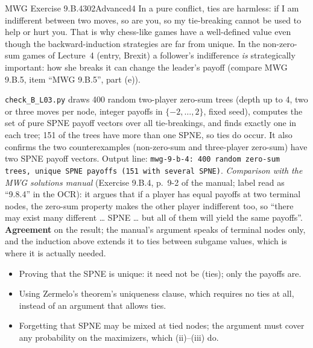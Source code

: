 \begin{exsol}{MWG Exercise 9.B.4}{302}{Advanced}{4}
\interp In a pure conflict, ties are harmless: if I am indifferent between two moves, so are you,
so my tie-breaking cannot be used to help or hurt you. That is why chess-like games have a
well-defined value even though the backward-induction strategies are far from unique. In the
non-zero-sum games of Lecture~4 (entry, Brexit) a follower's indifference \emph{is} strategically
important: how she breaks it can change the leader's payoff (compare MWG 9.B.5, item ``MWG 9.B.5'',
part (e)).

\verify \texttt{check\_B\_L03.py} draws 400 random two-player zero-sum trees (depth up to 4, two or
three moves per node, integer payoffs in $\{-2, \dots, 2\}$, fixed seed), computes the set of pure
SPNE payoff vectors over all tie-breakings, and finds exactly one in each tree; 151 of the trees have
more than one SPNE, so ties do occur. It also confirms the two counterexamples (non-zero-sum and
three-player zero-sum) have two SPNE payoff vectors. Output line: \texttt{mwg-9-b-4: 400 random
zero-sum trees, unique SPNE payoffs (151 with several SPNE)}.
\emph{Comparison with the MWG solutions manual} (Exercise 9.B.4, p.~9-2 of the manual; label read
as ``9.8.4'' in the OCR): it argues that if a player has equal payoffs at two terminal nodes, the
zero-sum property makes the other player indifferent too, so ``there may exist many different
\dots{} SPNE \dots{} but all of them will yield the same payoffs''. \textbf{Agreement} on the result;
the manual's argument speaks of terminal nodes only, and the induction above extends it to ties
between subgame values, which is where it is actually needed.

\mistakes
\begin{itemize}
  \item Proving that the SPNE is unique: it need not be (ties); only the payoffs are.
  \item Using Zermelo's theorem's uniqueness clause, which requires no ties at all, instead of an
  argument that allows ties.
  \item Forgetting that SPNE may be mixed at tied nodes; the argument must cover any probability on
  the maximizers, which (ii)--(iii) do.
\end{itemize}

\end{exsol}
